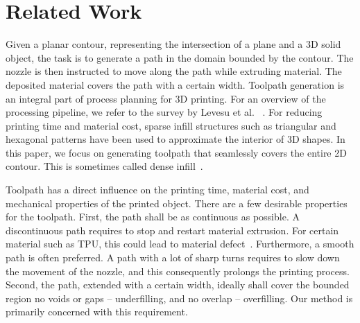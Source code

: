 \section{Related Work}

Given a planar contour, representing the intersection of a plane and a 3D solid object, the task is to generate a path in the domain bounded by the contour. The nozzle is then instructed to move along the path while extruding material. The deposited material covers the path with a certain width. Toolpath generation is an integral part of process planning for 3D printing. For an overview of the processing pipeline, we refer to the survey by Levesu et al.~\cite{Livesu2017CGF} . For reducing printing time and material cost, sparse infill structures such as triangular and hexagonal patterns have been used to approximate the interior of 3D shapes. In this paper, we focus on generating toolpath that seamlessly covers the entire 2D contour. This is sometimes called dense infill~\cite{Livesu2017CGF}.

Toolpath has a direct influence on the printing time, material cost, and mechanical properties of the printed object. There are a few desirable properties for the toolpath. First, the path shall be as continuous as possible. A discontinuous path requires to stop and restart material extrusion. For certain material such as TPU, this could lead to material defect~\cite{KUIPERS2019CAD}. Furthermore, a smooth path is often preferred. A path with a lot of sharp turns requires to slow down the movement of the nozzle, and this consequently prolongs the printing process. Second, the path, extended with a certain width, ideally shall cover the bounded region no voids or gaps --  underfilling, and no overlap -- overfilling. Our method is primarily concerned with this requirement. 

